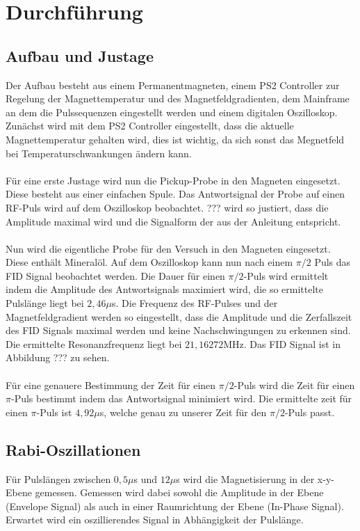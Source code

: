 \section{Durchführung}
\subsection{Aufbau und Justage}
Der Aufbau besteht aus einem Permanentmagneten, einem PS2 Controller zur Regelung der Magnettemperatur und des Magnetfeldgradienten, dem Mainframe an dem die Pulssequenzen eingestellt werden und einem digitalen Oszilloskop. Zunächst wird mit dem PS2 Controller eingestellt, dass die aktuelle Magnettemperatur gehalten wird, dies ist wichtig, da sich sonst das Megnetfeld bei Temperaturschwankungen ändern kann. \\ \\
Für eine erste Justage wird nun die Pickup-Probe in den Magneten eingesetzt. Diese besteht aus einer einfachen Spule. Das Antwortsignal der Probe auf einen RF-Puls wird auf dem Oszilloskop beobachtet. ??? wird so justiert, dass die Amplitude maximal wird und die Signalform der aus der Anleitung entspricht. \\ \\
Nun wird die eigentliche Probe für den Versuch in den Magneten eingesetzt. Diese enthält Mineralöl. Auf dem Oszilloskop kann nun nach einem $\pi/2$ Puls das FID Signal beobachtet werden. Die Dauer für einen $\pi/2$-Puls wird ermittelt indem die Amplitude des Antwortsignals maximiert wird, die so ermittelte Pulslänge liegt bei $2,46 \mu$s. Die Frequenz des RF-Pulses und der Magnetfeldgradient werden so eingestellt, dass die Amplitude und die Zerfallszeit des FID Signals maximal werden und keine Nachschwingungen zu erkennen sind. Die ermittelte Resonanzfrequenz liegt bei $21,16272$MHz. Das FID Signal ist in Abbildung ??? zu sehen. \\ \\
Für eine genauere Bestimmung der Zeit für einen $\pi/2$-Puls wird die Zeit für einen $\pi$-Puls bestimmt indem das Antwortsignal minimiert wird. Die ermittelte zeit für einen $\pi$-Puls ist $4,92\mu$s, welche genau zu unserer Zeit für den $\pi/2$-Puls passt.

\subsection{Rabi-Oszillationen}
Für Pulslängen zwischen $0,5\mu$s und $12\mu$s wird die Magnetisierung in der x-y-Ebene gemessen. Gemessen wird dabei sowohl die Amplitude in der Ebene (Envelope Signal) als auch in einer Raumrichtung der Ebene (In-Phase Signal). Erwartet wird ein oszillierendes Signal in Abhängigkeit der Pulslänge. 

